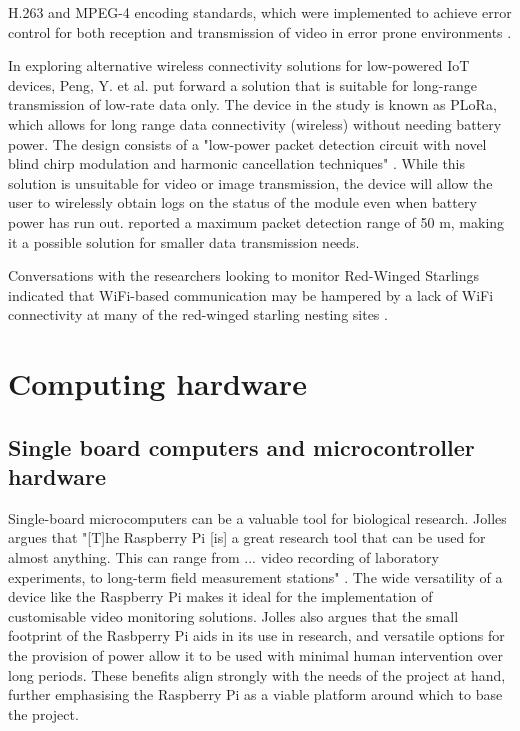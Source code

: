 \documentclass[class=report,11pt,crop=false]{standalone}
\begin{document}
\cite{adsumilli2002adaptive} H.263 and MPEG-4 encoding standards, which were implemented to achieve error control for both reception and transmission of video in error prone environments \cite{adsumilli2002adaptive}.

In exploring alternative wireless connectivity solutions for low-powered IoT devices, Peng, Y. et al. \cite{peng2018plora} put forward a solution that is suitable for long-range transmission of low-rate data only. The device in the study is known as PLoRa, which allows for long range data connectivity (wireless) without needing battery power. The design consists of a "low-power packet detection circuit with novel blind chirp modulation and harmonic cancellation techniques" \cite{peng2018plora}. While this solution is unsuitable for video or image transmission, the device will allow the user to wirelessly obtain logs on the status of the module even when battery power has run out. \cite{peng2018plora} reported a maximum packet detection range of 50 m, making it a possible solution for smaller data transmission needs. 

Conversations with the researchers looking to monitor Red-Winged Starlings indicated that WiFi-based communication may be hampered by a lack of WiFi connectivity at many of the red-winged starling nesting sites \cite{hofmeyer2024private}.

\section{Computing hardware}

\subsection{Single board computers and microcontroller hardware}

Single-board microcomputers can be a valuable tool for biological research. Jolles argues that "[T]he Raspberry Pi [is] a great research tool that can be used for almost anything. This can range from ... video recording of laboratory experiments, to long-term field measurement stations" \cite{jolles2021broad-scale}. The wide versatility of a device like the Raspberry Pi makes it ideal for the implementation of customisable video monitoring solutions. Jolles \cite{jolles2021broad-scale} also argues that the small footprint of the Rasbperry Pi aids in its use in research, and versatile options for the provision of power allow it to be used with minimal human intervention over long periods. These benefits align strongly with the needs of the project at hand, further emphasising the Raspberry Pi as a viable platform around which to base the project.
\end{document}
